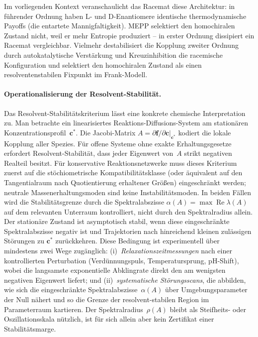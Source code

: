 \documentclass[12pt,a4paper]{article}
\theoremstyle{remark}
\begin{document}
Im vorliegenden Kontext veranschaulicht das Racemat diese Architektur: in führender Ordnung haben L- und D-Enantiomere identische thermodynamische Payoffs (die entartete Mannigfaltigkeit). MEPP selektiert den homochiralen Zustand nicht, weil er mehr Entropie produziert -- in erster Ordnung dissipiert ein Racemat vergleichbar. Vielmehr destabilisiert die Kopplung zweiter Ordnung durch autokatalytische Verstärkung und Kreuzinhibition die racemische Konfiguration und selektiert den homochiralen Zustand als einen resolventenstabilen Fixpunkt im Frank-Modell.

\paragraph{Operationalisierung der Resolvent-Stabilität.}
Das Resolvent-Stabilitätskriterium lässt eine konkrete chemische
Interpretation zu.  Man betrachte ein linearisiertes Reaktions-Diffusions-System
am stationären Konzentrationsprofil~$\mathbf{c}^{*}$.  Die Jacobi-Matrix
$A = \partial \mathbf{f}/\partial \mathbf{c}\big|_{\mathbf{c}^{*}}$
kodiert die lokale Kopplung aller Spezies.  Für offene Systeme ohne exakte
Erhaltungsgesetze erfordert Resolvent-Stabilität, dass jeder Eigenwert von~$A$
strikt negativen Realteil besitzt.  Für konservative Reaktionsnetzwerke muss
dieses Kriterium zuerst auf die stöchiometrische Kompatibilitätsklasse (oder
äquivalent auf den Tangentialraum nach Quotientierung erhaltener Größen)
eingeschränkt werden; neutrale Massenerhaltungsmoden sind keine
Instabilitätsmoden.  In beiden Fällen wird die Stabilitätsgrenze durch die
Spektralabszisse $\alpha(A)=\max \operatorname{Re}\lambda(A)$ auf dem relevanten
Unterraum kontrolliert, nicht durch den Spektralradius allein.  Der stationäre
Zustand ist asymptotisch stabil, wenn diese eingeschränkte Spektralabszisse
negativ ist und Trajektorien nach hinreichend kleinen zulässigen Störungen zu
$\mathbf{c}^{*}$ zurückkehren.
Diese Bedingung ist experimentell über mindestens zwei Wege zugänglich:
(i)~\emph{Relaxationszeitmessungen} nach einer kontrollierten Perturbation
(Verdünnungspuls, Temperatursprung, pH-Shift), wobei die langsamste
exponentielle Abklingrate direkt den am wenigsten negativen Eigenwert liefert;
und (ii)~\emph{systematische Störungsscans}, die abbilden, wie sich die
eingeschränkte Spektralabszisse~$\alpha(A)$ über Umgebungsparameter der Null
nähert und so die Grenze der resolvent-stabilen Region im Parameterraum
kartieren. Der Spektralradius~$\rho(A)$ bleibt als Steifheits- oder
Oszillationsskala nützlich, ist für sich allein aber kein Zertifikat einer
Stabilitätsmarge.
\end{document}
